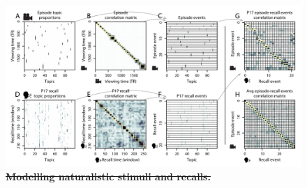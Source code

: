 \documentclass[10pt]{article} %
\providecommand{\DIFdeltex}[1]{{\protect\color{red}\sout{#1}}}                      %
\providecommand{\DIFdelFL}[1]{\DIFdel{#1}} %
\providecommand{\DIFdelbeginFL}{} %
\providecommand{\DIFdel}[1]{\texorpdfstring{\DIFdeltex{#1}}{}} %
\newcommand{\DIFscaledelfig}{0.5}
\newlength{\DIFdelgraphicswidth} %
\newlength{\DIFdelgraphicsheight} %
\newcommand{\DIFdelincludegraphics}[2][]{%
\sbox{\DIFdelgraphicsbox}{\DIFOincludegraphics[#1]{#2}}%
\settoboxwidth{\DIFdelgraphicswidth}{\DIFdelgraphicsbox} %
\settoboxtotalheight{\DIFdelgraphicsheight}{\DIFdelgraphicsbox} %
\scalebox{\DIFscaledelfig}{%
\parbox[b]{\DIFdelgraphicswidth}{\usebox{\DIFdelgraphicsbox}\\[-\baselineskip] \rule{\DIFdelgraphicswidth}{0em}}\llap{\resizebox{\DIFdelgraphicswidth}{\DIFdelgraphicsheight}{%
\setlength{\unitlength}{\DIFdelgraphicswidth}%
\begin{picture}(1,1)%
\thicklines\linethickness{2pt} %
{\color[rgb]{1,0,0}\put(0,0){\framebox(1,1){}}}%
{\color[rgb]{1,0,0}\put(0,0){\line( 1,1){1}}}%
{\color[rgb]{1,0,0}\put(0,1){\line(1,-1){1}}}%
\end{picture}%
}\hspace*{3pt}}} %
} %
\DeclareRobustCommand{\DIFdelbeginFL}{\DIFOdelbeginFL \let\includegraphics\DIFdelincludegraphics} %
\begin{document}
\begin{figure}[tp]
\centering
\includegraphics[width=\textwidth]{figs/eventseg}
\caption{\small \DIFdelbeginFL \textbf{\DIFdelFL{Modelling naturalistic stimuli and recalls.}} %
}
\end{figure}
\end{document}
